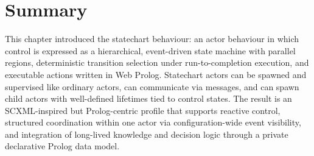 \section{Summary}\label{sec:summary}

This chapter introduced the statechart behaviour: an actor behaviour in which control is expressed as a hierarchical, event-driven state machine with parallel regions, deterministic transition selection under run-to-completion execution, and executable actions written in Web Prolog. Statechart actors can be spawned and supervised like ordinary actors, can communicate via messages, and can spawn child actors with well-defined lifetimes tied to control states. The result is an SCXML-inspired but Prolog-centric profile that supports reactive control, structured coordination within one actor via configuration-wide event visibility, and integration of long-lived knowledge and decision logic through a private declarative Prolog data model.



